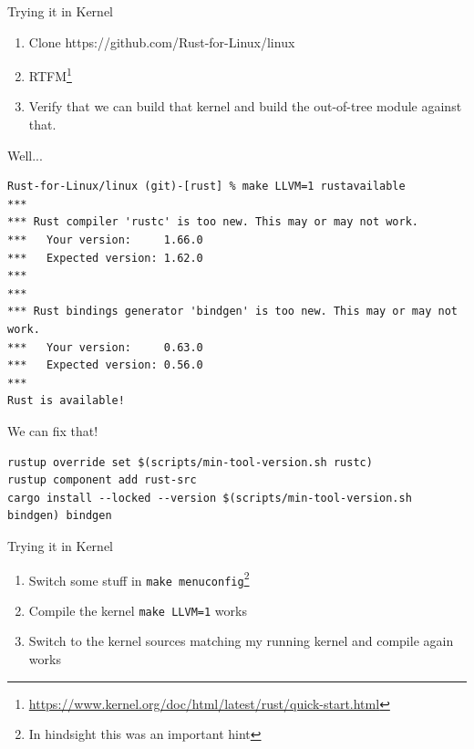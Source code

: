 \begin{frame}[c,fragile]{Trying it in Kernel}
\begin{enumerate}
\item Clone https://github.com/Rust-for-Linux/linux
\item RTFM\footnote{\url{https://www.kernel.org/doc/html/latest/rust/quick-start.html}}
\item Verify that we can build that kernel and build the out-of-tree module against that.
\end{enumerate}
\end{frame}

\begin{frame}[c,fragile]{Well...}
\begin{verbatim}
Rust-for-Linux/linux (git)-[rust] % make LLVM=1 rustavailable
***
*** Rust compiler 'rustc' is too new. This may or may not work.
***   Your version:     1.66.0
***   Expected version: 1.62.0
***
***
*** Rust bindings generator 'bindgen' is too new. This may or may not work.
***   Your version:     0.63.0
***   Expected version: 0.56.0
***
Rust is available!
\end{verbatim}
\end{frame}

\begin{frame}[c,fragile]{We can fix that!}
\begin{verbatim}
rustup override set $(scripts/min-tool-version.sh rustc)
rustup component add rust-src
cargo install --locked --version $(scripts/min-tool-version.sh bindgen) bindgen
\end{verbatim}
\end{frame}

\begin{frame}[c,fragile]{Trying it in Kernel}
\begin{enumerate}
\item Switch some stuff in \texttt{make menuconfig}\footnote{In hindsight this was an important hint}
\item Compile the kernel \texttt{make LLVM=1} \rightarrow{} works
\item Switch to the kernel sources matching my running kernel and compile again \rightarrow{} works
\end{enumerate}
\end{frame}

